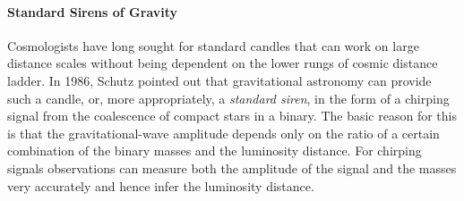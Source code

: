 \paragraph{Standard Sirens of Gravity}

Cosmologists have long sought for standard candles that can 
work on large distance scales without being dependent on the 
lower rungs of cosmic distance ladder. In 1986, Schutz \cite{Schutz86} 
pointed out that gravitational astronomy can 
provide such a candle, or, more appropriately, a {\em standard 
siren}, in the form of a chirping signal from the coalescence 
of compact stars in a binary.
The basic reason for this is that the gravitational-wave 
amplitude depends only on the ratio of a certain combination of the
binary masses and the luminosity distance. For chirping signals 
observations can measure both the amplitude of the signal and 
the masses very accurately and hence infer the luminosity distance.

